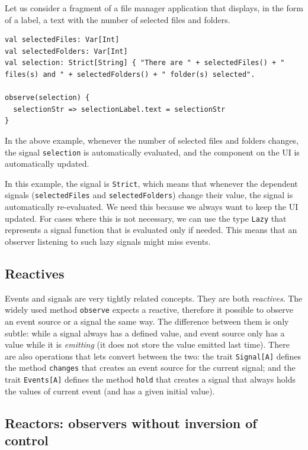 Let us consider a fragment of a file manager application that displays, in the form of a label, a text with the number of selected files and folders.

\begin{lstlisting}
val selectedFiles: Var[Int]
val selectedFolders: Var[Int]
val selection: Strict[String] { "There are " + selectedFiles() + " files(s) and " + selectedFolders() + " folder(s) selected".

observe(selection) {
  selectionStr => selectionLabel.text = selectionStr
}
\end{lstlisting}

In the above example, whenever the number of selected files and folders changes, the signal \texttt{selection} is automatically evaluated, and the component on the UI is automatically updated. 

In this example, the signal is \texttt{Strict}, which means that whenever the dependent signals (\texttt{selectedFiles} and \texttt{selectedFolders}) change their value, the signal is automatically re-evaluated. We need this because we always want to keep the UI updated. For cases where this is not necessary, we can use the type \texttt{Lazy} that represents a signal function that is evaluated only if needed. This means that an observer listening to such lazy signals might miss events.

\subsection{Reactives}

Events and signals are very tightly related concepts. They are both \emph{reactives}. The widely used method \texttt{observe} expects a reactive, therefore it possible to observe an event source or a signal the same way. The difference between them is only subtle: while a signal always has a defined value, and event source only has a value while it is \emph{emitting} (it does not store the value emitted last time). There are also operations that lets convert between the two: the trait \texttt{Signal[A]} defines the method \texttt{changes} that creates an event source for the current signal; and the trait \texttt{Events[A]} defines the method \texttt{hold} that creates a signal that always holds the values of current event (and has a given initial value).

\subsection{Reactors: observers without inversion of control}

